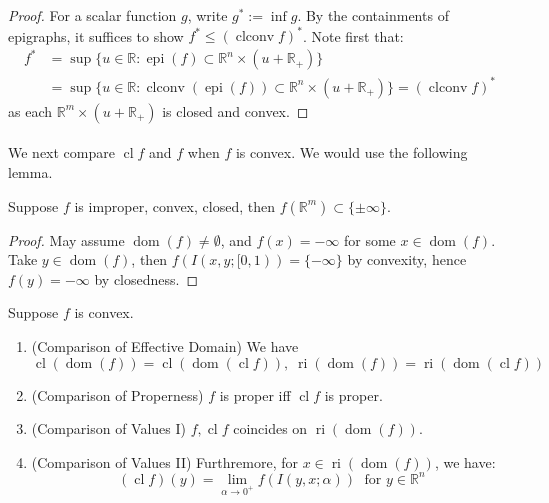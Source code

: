 \begin{proof}
	For a scalar function $g$, write $g^\ast:=\inf g$. By the containments of epigraphs, it suffices to show $f^\ast\leq(\operatorname{clconv}f)^\ast$. Note first that:
	\begin{align*}
		f^\ast & = \sup \{u\in \mathbb{R}: \operatorname{epi}(f)\subset \mathbb{R}^n\times (u + \mathbb{R}_+)\}                                                                 \\
		       & = \sup \{u\in \mathbb{R}: \operatorname{clconv}(\operatorname{epi}(f))\subset \mathbb{R}^n\times (u + \mathbb{R}_+)\}=\left(\operatorname{clconv}f\right)^\ast
	\end{align*}
	as each $\mathbb{R}^m\times(u + \mathbb{R}_+)$ is closed and convex.
\end{proof}

\paragraph{}We next compare $\operatorname{cl}f$ and $f$ when $f$ is convex. We would use the following lemma.

\begin{lemm}
	\label{lemm:023-improper-closed-convex}
	Suppose $f$ is improper, convex, closed, then $f(\mathbb{R}^m)\subset\{\pm\infty\}$.
\end{lemm}

\begin{proof}
	May assume $\operatorname{dom}(f)\neq \emptyset$, and $f(x)=-\infty$ for some $x\in \operatorname{dom}(f)$. Take $y\in \operatorname{dom}(f)$, then $f(I(x,y;[0, 1))=\{-\infty\}$ by convexity, hence $f(y)=-\infty$ by closedness.
\end{proof}


\begin{prop}
	\label{prop:023-compare-func-closure}
	Suppose $f$ is convex.
	\begin{enumerate}[label=(\alph*)]
		\item (Comparison of Effective Domain) We have
		      \[
			      \operatorname{cl}(\operatorname{dom}(f))=
			      \operatorname{cl}(\operatorname{dom}(\operatorname{cl}f)),\;
			      \operatorname{ri}(\operatorname{dom}(f))=
			      \operatorname{ri}(\operatorname{dom}(\operatorname{cl}f))
		      \]
		\item (Comparison of Properness) $f$ is proper iff $\operatorname{cl}f$ is proper.
		\item (Comparison of Values I) $f,\operatorname{cl}f$ coincides on $\operatorname{ri}(\operatorname{dom}(f))$.
		\item (Comparison of Values II) Furthremore, for $x\in \operatorname{ri}(\operatorname{dom}(f))$, we have:
		      \[
			      (\operatorname{cl}f)(y)=\lim_{\alpha \to0^+}f(I(y,x;\alpha ))\;\text{ for }y\in \mathbb{R}^n
		      \]
	\end{enumerate}
\end{prop}

